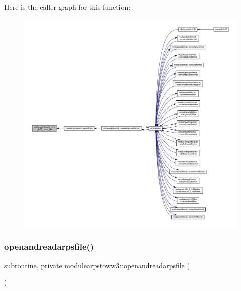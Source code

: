 Here is the caller graph for this function\+:\nopagebreak
\begin{figure}[H]
\begin{center}
\leavevmode
\includegraphics[width=350pt]{namespacemodulearpstoww3_a7a7eb9b823582e046e2127ea46d3f300_icgraph}
\end{center}
\end{figure}
\mbox{\label{namespacemodulearpstoww3_aa5a12099f3353b33d3b40f8f3f4384f0}} 
\subsubsection{\texorpdfstring{openandreadarpsfile()}{openandreadarpsfile()}}
{\footnotesize\ttfamily subroutine, private modulearpstoww3\+::openandreadarpsfile (\begin{DoxyParamCaption}{ }\end{DoxyParamCaption})\hspace{0.3cm}{\ttfamily [private]}}

